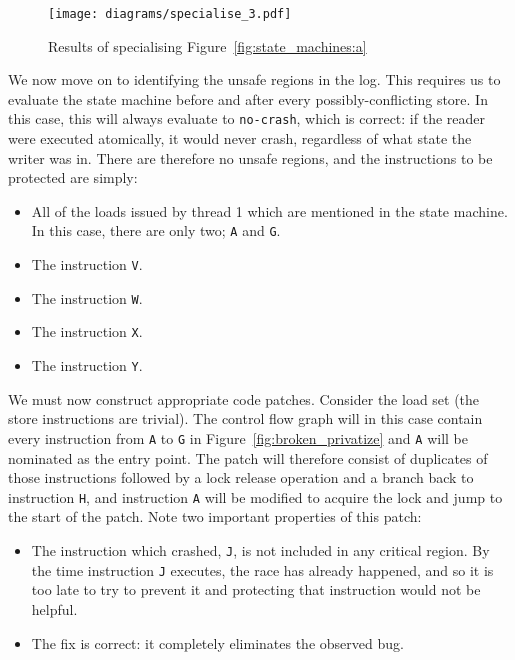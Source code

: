 \documentclass[10pt,letter,twocolumn]{sigplanconf}
\begin{document}
\begin{figure}[thb]
\texttt{[image: diagrams/specialise\_3.pdf]}
\caption{Results of specialising Figure~\ref{fig:state_machines:a}}
\label{fig:specialised_example_machine}
\end{figure}

We now move on to identifying the unsafe regions in the log.  This
requires us to evaluate the state machine before and after every
possibly-conflicting store.  In this case, this will always evaluate
to \verb|no-crash|, which is correct: if the reader were executed
atomically, it would never crash, regardless of what state the writer
was in.  There are therefore no unsafe regions, and the instructions
to be protected are simply:

\begin{itemize}
\item All of the loads issued by thread 1 which are mentioned in the
  state machine.  In this case, there are only two; \verb|A| and
  \verb|G|.
\item The instruction \verb|V|.
\item The instruction \verb|W|.
\item The instruction \verb|X|.
\item The instruction \verb|Y|.
\end{itemize}

We must now construct appropriate code patches.  Consider the load set
(the store instructions are trivial).  The control flow graph will in
this case contain every instruction from \verb|A| to \verb|G| in
Figure~\ref{fig:broken_privatize} and \verb|A| will be nominated as
the entry point.  The patch will therefore consist of duplicates of
those instructions followed by a lock release operation and a branch
back to instruction \verb|H|, and instruction \verb|A| will be
modified to acquire the lock and jump to the start of the patch.  Note
two important properties of this patch:

\begin{itemize}
\item The instruction which crashed, \verb|J|, is not included in any
  critical region.  By the time instruction \verb|J| executes, the
  race has already happened, and so it is too late to try to prevent
  it and protecting that instruction would not be helpful.
\item The fix is correct: it completely eliminates the observed bug.
\end{itemize}
\end{document}
